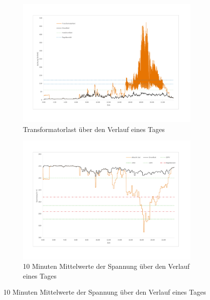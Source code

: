 \begin{figure}
	\begin{subfigure}{\linewidth}
		\includegraphics[scale=0.5]{img/VDE_tau_trafo/TrafoLast2.pdf}
		\caption{Transformatorlast über den Verlauf eines Tages}
		\label{Abb_VDETrafo_TrafoLast}
	\end{subfigure}
	\begin{subfigure}{\linewidth}
		\includegraphics[scale=0.5]{img/VDE_tau_trafo/Spannung2.pdf}
		\caption{10 Minuten Mittelwerte der Spannung über den Verlauf eines Tages}
		\label{Abb_VDETrafo_Spannung}
	\end{subfigure}
\end{figure}

